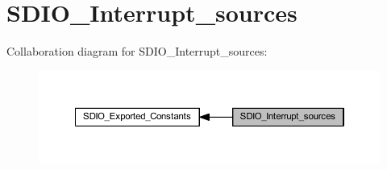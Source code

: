 \hypertarget{group___s_d_i_o___interrupt__sources}{}\section{S\+D\+I\+O\+\_\+\+Interrupt\+\_\+sources}
\label{group___s_d_i_o___interrupt__sources}
Collaboration diagram for S\+D\+I\+O\+\_\+\+Interrupt\+\_\+sources\+:
\nopagebreak
\begin{figure}[H]
\begin{center}
\leavevmode
\includegraphics[width=350pt]{group___s_d_i_o___interrupt__sources}
\end{center}
\end{figure}
